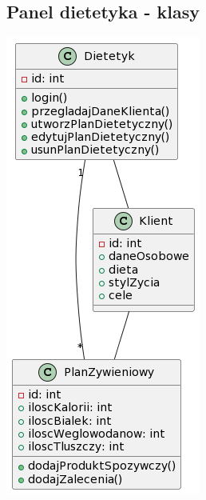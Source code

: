 \subsection{Panel dietetyka - klasy}\label{subsec:panel-dietetyka-classes}

\includegraphics{diagrams/class/dietetyk}
